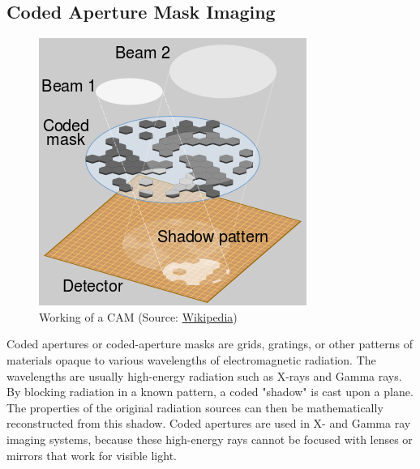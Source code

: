 \documentclass[11pt]{book} %
\begin{document}
\clearpage


\subsection{Coded Aperture Mask Imaging}


\begin{figure}
    \centering
    \includegraphics[scale=0.53]{Pictures/cam_working.png}
\caption{Working of a CAM (Source: \href{https://en.wikipedia.org/wiki/Coded_aperture}{Wikipedia})}
\end{figure}


Coded apertures or coded-aperture masks are grids, gratings, or other patterns of materials opaque to various wavelengths of electromagnetic radiation. The wavelengths are usually high-energy radiation such as X-rays and Gamma rays. By blocking radiation in a known pattern, a coded "shadow" is cast upon a plane. The properties of the original radiation sources can then be mathematically reconstructed from this shadow. Coded apertures are used in X- and Gamma ray imaging systems, because these high-energy rays cannot be focused with lenses or mirrors that work for visible light. 
\end{document}
